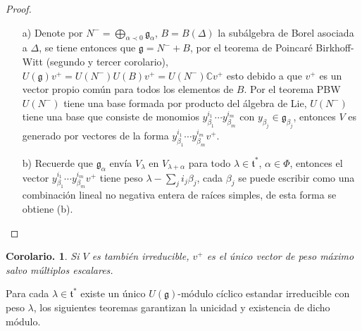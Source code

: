 \documentclass[11pt,a4paper]{article}
\newtheorem{corolary}{Corolario.}
\newcommand{\mfg}{\mathfrak{g}}
\begin{document}
\begin{proof}
\begin{itemize}
\item[a)] Denote por $N^- = \displaystyle \bigoplus_{\alpha\prec 0} \mfg_{\alpha}$, $B=B(\Delta)$ la subálgebra de Borel asociada a $\Delta$, se tiene entonces que $\mfg = N^- + B$, por el  teorema de Poincaré Birkhoff-Witt (segundo y tercer corolario), $U(\mfg)v^+= U(N^-) U(B)v^+ = U(N^-) \mathbb{C}v^+$ esto debido a que $v^+$ es un vector propio común para todos los elementos de $B$. Por el teorema PBW $U(N^{-})$ tiene una base formada por producto del álgebra de Lie, $U(N^-)$ tiene una base que consiste de monomios $y_{\beta_1}^{i_1}\cdots y_{\beta_m}^{i_m}$ con $y_{\beta_j}\in \mfg_{\beta_j}$, entonces $V$ es generado por vectores de la forma $y_{\beta_1}^{i_1}\cdots y_{\beta_m}^{i_m}v^+$. 
\item[b)] Recuerde que $\mfg_{\alpha}$ envía $V_{\lambda}$ en $V_{\lambda+ \alpha}$ para todo $\lambda \in \mathfrak{t}^*$, $\alpha \in \Phi$, entonces el vector $y_{\beta_1}^{i_1}\cdots y_{\beta_m}^{i_m}v^+$ tiene peso $\lambda- \displaystyle \sum_{j} i_j\beta_j$, cada $\beta_j$ se puede escribir como una combinación lineal no negativa entera de raíces simples, de esta forma se obtiene (b).
\end{itemize}
\end{proof}
\begin{corolary}
Si $V$ es también irreducible, $v^+$ es el único vector de peso máximo salvo múltiplos escalares.
\end{corolary}
Para cada $\lambda \in \mathfrak{t}^*$ existe un único $U(\mfg)$-módulo cíclico estandar irreducible con peso $\lambda$, los siguientes teoremas garantizan la unicidad y existencia de dicho módulo. 
\end{document}
